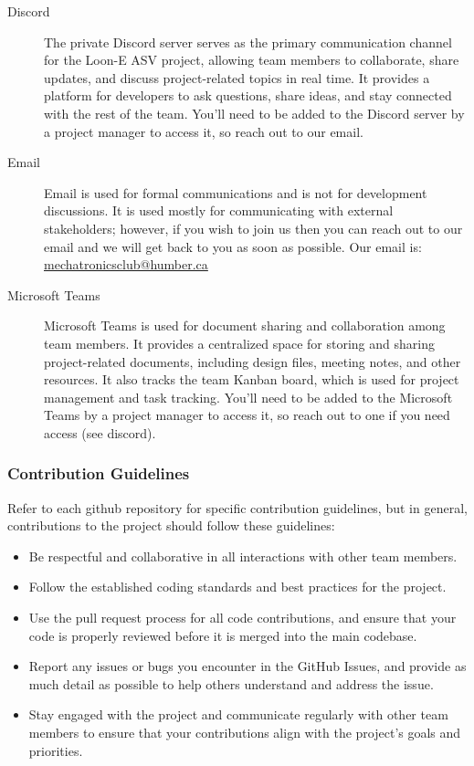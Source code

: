\begin{description}
    \item[Discord]
        The private Discord server serves as the primary communication channel for the Loon-E ASV project, allowing team members to collaborate, share updates, and discuss project-related topics in real time. 
        It provides a platform for developers to ask questions, share ideas, and stay connected with the rest of the team.
        You'll need to be added to the Discord server by a project manager to access it, so reach out to our email.

    \item[Email]
        Email is used for formal communications and is not for development discussions. 
        It is used mostly for communicating with external stakeholders; however, if you wish to join us then you can reach out to our email and we will get back to you as soon as possible.
        Our email is: \href{mailto:mechatronicsclub@humber.ca}{mechatronicsclub@humber.ca}

    \item[Microsoft Teams]
        Microsoft Teams is used for document sharing and collaboration among team members. 
        It provides a centralized space for storing and sharing project-related documents, including design files, meeting notes, and other resources.
        It also tracks the team Kanban board, which is used for project management and task tracking.
        You'll need to be added to the Microsoft Teams by a project manager to access it, so reach out to one if you need access (see discord).
\end{description}

\subsubsection{Contribution Guidelines}
Refer to each github repository for specific contribution guidelines, but in general, contributions to the project should follow these guidelines:

\begin{itemize}
    \item{Be respectful and collaborative in all interactions with other team members.}
    \item{Follow the established coding standards and best practices for the project.}
    \item{Use the pull request process for all code contributions, and ensure that your code is properly reviewed before it is merged into the main codebase.}
    \item{Report any issues or bugs you encounter in the GitHub Issues, and provide as much detail as possible to help others understand and address the issue.}
    \item{Stay engaged with the project and communicate regularly with other team members to ensure that your contributions align with the project's goals and priorities.}
\end{itemize}

